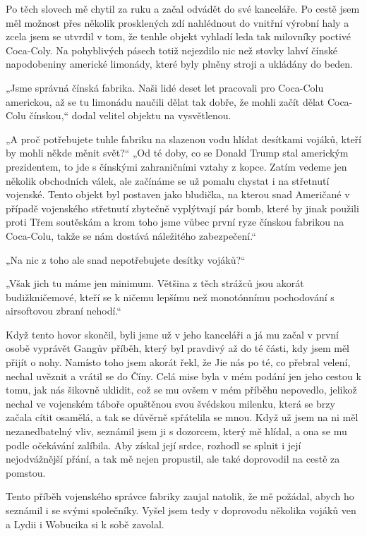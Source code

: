 Po těch slovech mě chytil za ruku a začal odvádět do své kanceláře. Po cestě jsem měl možnost přes několik prosklených zdí nahlédnout do vnitřní výrobní haly a zcela jsem se utvrdil v tom, že tenhle objekt vyhladí leda tak milovníky poctivé Coca-Coly. Na pohyblivých pásech totiž nejezdilo nic než stovky lahví čínské napodobeniny americké limonády, které byly plněny stroji a ukládány do beden.

„Jsme správná čínská fabrika. Naši lidé deset let pracovali pro Coca-Colu americkou, až se tu limonádu naučili dělat tak dobře, že mohli začít dělat Coca-Colu čínskou,“ dodal velitel objektu na vysvětlenou.

„A proč potřebujete tuhle fabriku na slazenou vodu hlídat desítkami vojáků, kteří by mohli někde měnit svět?“
„Od té doby, co se Donald Trump stal americkým prezidentem, to jde s čínskými zahraničními vztahy z kopce. Zatím vedeme jen několik obchodních válek, ale začínáme se už pomalu chystat i na střetnutí vojenské. Tento objekt byl postaven jako bludička, na kterou snad Američané v případě vojenského střetnutí zbytečně vyplýtvají pár bomb, které by jinak použili proti Třem soutěskám a krom toho jsme vůbec první ryze čínskou fabrikou na Coca-Colu, takže se nám dostává náležitého zabezpečení.“

„Na nic z toho ale snad nepotřebujete desítky vojáků?“

„Však jich tu máme jen minimum. Většina z těch strážců jsou akorát budižkničemové, kteří se k ničemu lepšímu než monotónnímu pochodování s airsoftovou zbraní nehodí.“

Když tento hovor skončil, byli jsme už v jeho kanceláři a já mu začal v první osobě vyprávět Gangův příběh, který byl pravdivý až do té části, kdy jsem měl přijít o nohy. Namísto toho jsem akorát řekl, že Jie nás po té, co přebral velení, nechal uvěznit a vrátil se do Číny. Celá mise byla v mém podání jen jeho cestou k tomu, jak nás šikovně uklidit, což se mu ovšem v mém příběhu nepovedlo, jelikož nechal ve vojenském táboře opuštěnou svou švédskou milenku, která se brzy začala cítit osamělá, a tak se důvěrně spřátelila se mnou. Když už jsem na ni měl nezanedbatelný vliv, seznámil jsem ji s dozorcem, který mě hlídal, a ona se mu podle očekávání zalíbila. Aby získal její srdce, rozhodl se splnit i její nejodvážnější přání, a tak mě nejen propustil, ale také doprovodil na cestě za pomstou. 

Tento příběh vojenského správce fabriky zaujal natolik, že mě požádal, abych ho seznámil i se svými společníky. Vyšel jsem tedy v doprovodu několika vojáků ven a Lydii i Wobucika si k sobě zavolal.

